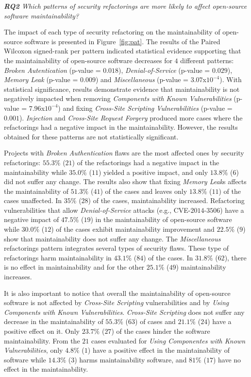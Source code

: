 \documentclass[10pt,conference]{IEEEtran}
\begin{document}
\begin{framed}
\textit{\textbf{RQ2} Which patterns of security refactorings are more likely to
affect open-source software maintainability?}
\end{framed}

The impact of each type of security refactoring on the maintainability of
open-source software is presented in Figure~\ref{fig:pat}. The results of the
Paired Wilcoxon signed-rank per pattern indicated statistical
evidence supporting that the maintainability of open-source software decreases
for $4$ different patterns: \emph{Broken Autentication} (p-value = $0.018$),
\emph{Denial-of-Service} (p-value = $0.029$), \emph{Memory Leak} (p-value = $0.009$) and
\emph{Miscellaneous} (p-value = $3.07$x$10^{-4}$). With statistical
significance, results demonstrate evidence that maintainability is not
negatively impacted when removing \emph{Components with Known Vulnerabilities}
(p-value = $7.96$x$10^{-4}$) and fixing \emph{Cross-Site Scripting
Vulnerabilities} (p-value = $0.001$). \emph{Injection} and \emph{Cross-Site
Request Forgery} produced more cases where the refactorings had a negative
impact in the maintainability. However, the results obtained for these patterns
are not statistically significant.

Projects with \emph{Broken Authentication} flaws are the most affected ones by
security refactorings: $55.3\%$ ($21$) of the refactorings had a negative impact
in the maintainability while $35.0\%$ ($11$) yielded a positive impact, and only
$13.8\%$ ($6$) did not suffer any change. The results also show that fixing
\emph{Memory Leak}s affects the maintainability of $51.3\%$ ($41$) of the cases
and leaves only $13.8\%$ ($11$) of the cases unaffected. In $35\%$ ($28$) of the
cases, maintainability increased. Refactoring vulnerabilities that allow
\emph{Denial-of-Service} attacks (e.g., CVE-$2014$-$3506$) have a negative
impact of $47.5\%$ ($19$) in the maintainability of open-source software while
$30.0\%$ ($12$) of the cases exhibit maintainability improvement and $22.5\%$
($9$) show that maintainability does not suffer any change. The
\emph{Miscellaneous} refactorings pattern integrates several types of security
flaws. These type of refactorings harm maintainability in $43.1\%$ ($84$) of the
cases. In $31.8\%$ ($62$), there is no effect in maintainability and for the
other $25.1\%$ ($49$) maintainability increases.

It is also important to notice that overall the maintainability of open-source
software is not affected by \emph{Cross-Site Scripting} vulnerabilities and by
\emph{Using Components with Known Vulnerabilities}. \emph{Cross-Site Scripting}
does not suffer any decrease in the maintainability of $55.3\%$ ($63$) of cases
and $21.1\%$ ($24$) have a positive effect on it. Only $23.7\%$ ($27$) of the
cases hinder the software maintainability. From the $21$ cases evaluated for
\emph{Using Componentes with Known Vulnerabilities}, only $4.8\%$ ($1$) have a
positive effect in the maintainability of software while $14.3\%$ ($3$) harms
maintainability software, and $81\%$ ($17$) have no effect in the
maintainability.
\end{document}
